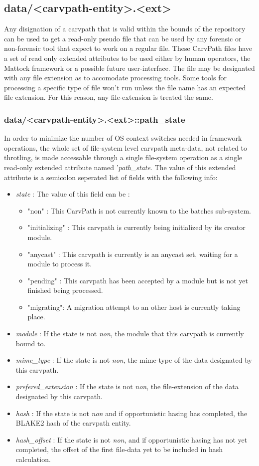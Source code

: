 \subsection{data/<carvpath-entity>.<ext>}
Any disignation of a carvpath that is valid within the bounds of the repository can be used to get a read-only pseudo file that can be used by any forensic or non-forensic tool that expect to work on a regular file. These CarvPath files have a set of read only extended attributes to be used either by human operators, the Mattock framework or a possible future user-interface.
The file may be designated with any file extension as to accomodate processing tools. Some tools for processing a specific type of file won't run unless the file name has an expected file extension. For this reason, any file-extension is treated the same.
\subsubsection{data/<carvpath-entity>.<ext>::path\_state}
In order to minimize the number of OS context switches needed in framework operations, the whole set of file-system level carvpath meta-data, not related to throtling, is made accessable through a single file-system operation as a single read-only extended attribute named '\emph{path\_state}. The value of this extended attribute is a semicolon seperated list of fields with the following info:
\begin{itemize}
\item \emph{state} : The value of this field can be :
\begin{itemize}
\item "non" : This CarvPath is not currently known to the batches sub-system. 
\item "initializing" : This carvpath is currently being initialized by its creator module.
\item "anycast" : This carvpath is currently is an anycast set, waiting for a module to process it.
\item "pending" : This carvpath has been accepted by a module but is not yet finished being processed.
\item "migrating": A migration attempt to an other host is currently taking place.
\end{itemize}
\item \emph{module} : If the state is not \emph{non}, the module that this carvpath is currently bound to.
\item \emph{mime\_type} : If the state is not \emph{non}, the mime-type of the data designated by this carvpath.
\item \emph{prefered\_extension} : If the state is not \emph{non}, the file-extension of the data designated by this carvpath.
\item \emph{hash} : If the state is not \emph{non} and if opportunistic hasing has completed, the BLAKE2 hash of the carvpath entity.
\item \emph{hash\_offset} : If the state is not \emph{non}, and if opportunistic hasing has not yet completed, the offset of the first file-data yet to be included in hash calculation.
\end{itemize}
